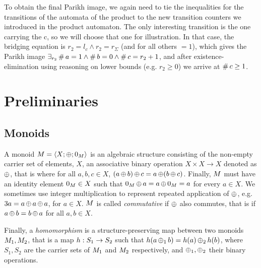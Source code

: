 \documentclass[acmsmall,review,anonymous,screen]{acmart}\settopmatter{printfolios=true,printccs=true,printacmref=true}
\theoremstyle{definition}
\begin{document}

To obtain the final Parikh image, we again need to tie the inequalities for the
transitions of the automata of the product to the new transition counters we
introduced in the product automaton. The only interesting transition is the one
carrying the c, so we will choose that one for illustration. In that case, the
bridging equation is $r_2 = l_c \land r_2 = r_{\Sigma}$ (and for all others
$=1$), which gives the Parikh image $\exists_{r_2} \operatorname{\#}{a} = 1 \land
\operatorname{\#}{b} = 0 \land \operatorname{\#}{c} = r_2 + 1$, and after
existence-elimination using reasoning on lower bounds (e.g. $r_2 \geq 0$) we
arrive at $\operatorname{\#}{c} \geq 1$.

\section{Preliminaries}

\subsection{Monoids}

A monoid $M = \left\langle X;\operatorname{\oplus};0_{M}\right\rangle$ is an algebraic structure
consisting of the non-empty carrier set of elements, $X$, an associative binary operation
$X \times X \rightarrow X$ denoted as $\operatorname{\oplus}$, that is where for all $a, b,
c \in X$, $(a \operatorname{\oplus} b) \operatorname{\oplus} c = a \operatorname{\oplus} (b \operatorname{\oplus} c)$. Finally,
$M$ must have an identity element $0_{M} \in X$ such that
$0_{M} \operatorname{\oplus} a = a \operatorname{\oplus} 0_{M} =   a$ for every $a \in X$.
We sometimes use integer multiplication to represent repeated application of
$\operatorname{\oplus}$, e.g. $3a = a \operatorname{\oplus} a \operatorname{\oplus} a$, for $a \in X$. $M$ is
called \textit{commutative} if $\operatorname{\oplus}$ also commutes, that is if $a
\operatorname{\oplus} b = b \operatorname{\oplus} a$ for all $a, b \in X$. 

Finally, a \textit{homomorphism} is a structure-preserving map between two monoids
$M_1, M_2$, that is a map $h : S_1 \rightarrow S_2$ such that $h(a
\operatorname{\oplus}_1 b) = h(a) \operatorname{\oplus}_2 h(b)$, where $S_1, S_2$ are the carrier
sets of $M_1$ and $M_2$ respectively, and $\operatorname{\oplus}_1, \operatorname{\oplus}_2$
their binary operations.
\end{document}
